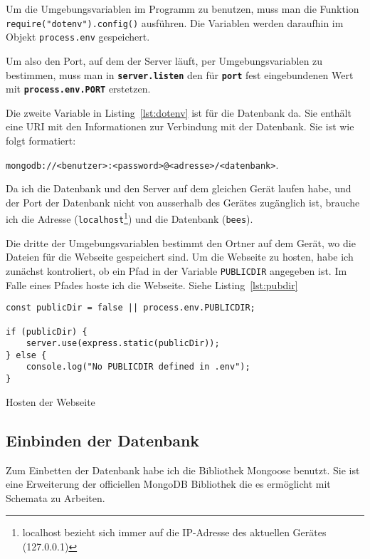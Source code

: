 \documentclass[a4paper, ngerman, 11pt]{scrartcl}
\newcommand{\js}[1]{\texttt{#1}}
\begin{document}
Um die Umgebungsvariablen im Programm zu benutzen, muss man die Funktion \js{require("dotenv").config()} ausführen.
Die Variablen werden daraufhin im Objekt \js{process.env} gespeichert.

Um also den Port, auf dem der Server läuft, per Umgebungsvariablen zu bestimmen, muss man in \textbf{\js{server.listen}} den für \textbf{\texttt{port}} fest eingebundenen Wert mit \textbf{\js{process.env.PORT}} erstetzen.

Die zweite Variable in Listing~\ref{lst:dotenv} ist für die Datenbank da.
Sie enthält eine URI mit den Informationen zur Verbindung mit der Datenbank.
Sie ist wie folgt formatiert:

\texttt{mongodb://<benutzer>:<password>@<adresse>/<datenbank>}.

Da ich die Datenbank und den Server auf dem gleichen Gerät laufen habe, und der Port der Datenbank nicht von ausserhalb des Gerätes zugänglich ist, brauche ich die Adresse (\texttt{localhost}\footnote{localhost bezieht sich immer auf die IP-Adresse des aktuellen Gerätes (127.0.0.1) }) und die Datenbank (\texttt{bees}).

Die dritte der Umgebungsvariablen bestimmt den Ortner auf dem Gerät, wo die Dateien für die Webseite gespeichert sind.
Um die Webseite zu hosten, habe ich zunächst kontroliert, ob ein Pfad in der Variable \texttt{PUBLICDIR} angegeben ist. Im Falle eines Pfades hoste ich die Webseite. Siehe Listing~\ref{lst:pubdir}
\begin{listing}[ht]
\centering
\begin{verbatim}
const publicDir = false || process.env.PUBLICDIR;

if (publicDir) {
    server.use(express.static(publicDir));
} else {
    console.log("No PUBLICDIR defined in .env");
}
\end{verbatim}
\caption{Hosten der Webseite\label{lst:pubdir}}
\end{listing}


\subsection[Einbettung der Datenbank]{Einbinden der Datenbank} %

Zum Einbetten der Datenbank habe ich die Bibliothek Mongoose benutzt. Sie ist eine Erweiterung der officiellen MongoDB Bibliothek die es ermöglicht mit Schemata zu Arbeiten.
\end{document}
